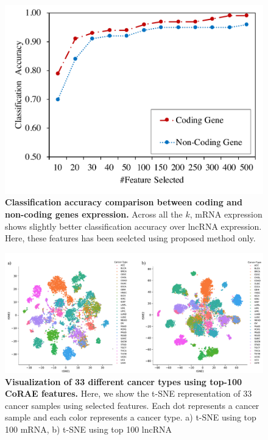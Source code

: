 \documentclass{bioinfo}
\begin{document}
\begin{figure}[hbt]
    \centering
    \includegraphics[scale=0.6]{fig/acc-mRNA-lncRNA.pdf}
    \caption{\textbf{Classification accuracy comparison between coding and non-coding genes expression.} Across all the $k$, mRNA expression shows slightly better classification accuracy over lncRNA expression. Here, these features has been seelcted using proposed method only.}
    \label{fig:acc-mRNA-lncRNA.}
\end{figure}

\begin{figure}[hbt]
    \centering
    \includegraphics[scale=0.45]{fig/tSNE.pdf}
    \caption{\textbf{Visualization of 33 different cancer types using top-100 CoRAE features.} Here, we show the t-SNE representation of 33 cancer samples using selected features. Each dot represents a cancer sample and each color represents a cancer type. a) t-SNE using top 100 mRNA, b) t-SNE using top 100 lncRNA}
    \label{fig:tsne}
\end{figure}
\end{document}
